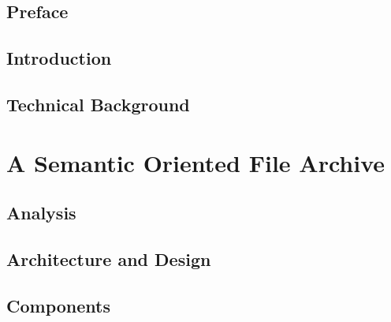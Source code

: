 \documentclass[12pt,a4paper,final,oneside,openany]{memoir}
\title{\CodeName}
\subtitle{\large A semantics oriented file archive for big data analysis}
\author{\Large \FullName \quad {\ttfamily\large ckh340@alumni.ku.dk}}
\date{\HandinDate}
\theoremstyle{definition}
\begin{document}
\pagestyle{empty}
\frontmatter
\clearpage

\maketitle
\clearpage

\pagestyle{plain}
\vspace{3cm}
\begin{abstract}

\end{abstract}

\setlength{\cftpartnumwidth}{4em}

\chapter{Preface}


\clearpage
\tableofcontents*

\clearpage
\listoffigures*

\mainmatter
{}
\pagestyle{diku}


\chapter{Introduction}


\chapter{Technical Background} \label{chp:background}



\part{A Semantic Oriented File Archive} \label{prt:sofa}
\chapter{Analysis} \label{chp:analysis}


\chapter{Architecture and Design} \label{chp:architecture}


\chapter{Components} \label{chp:components}

\end{document}

